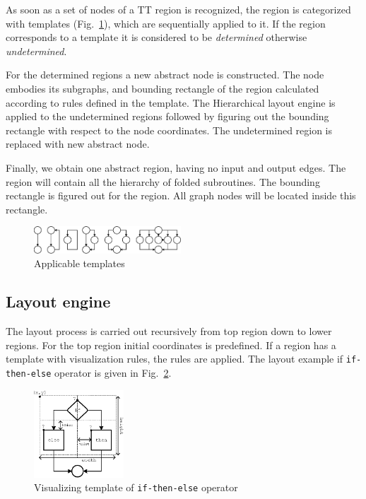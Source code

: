 \documentclass[conference]{IEEEtran}
\begin{document}

As soon as a set of nodes of a TT region is recognized, the region is categorized with templates (Fig.~\ref{fig:Regions}), which are sequentially applied to it.  If the region corresponds to a template it is considered to be \emph{determined} otherwise \emph{undetermined}.

For the determined regions a new abstract node is constructed.  The node embodies its subgraphs, and bounding rectangle of the region calculated according to rules defined in the template.  The Hierarchical layout engine is applied to the undetermined regions followed by figuring out the bounding rectangle with respect to the node coordinates.  The undetermined region is replaced with new abstract node.

Finally, we obtain one abstract region, having no input and output edges.  The region will contain all the hierarchy of folded subroutines.  The bounding rectangle is figured out for the region.  All graph nodes will be located inside this rectangle.

\begin{figure}[b]
	\centering
		\includegraphics[width=0.49\textwidth]{Pic/Reg.eps}
	\caption{Applicable templates}
	\label{fig:Regions}
\end{figure}

\subsection{Layout engine}
\label{sec:raskladka-process}

The layout process is carried out recursively from top region down to lower regions.  For the top region initial coordinates is predefined.  If a region has a template with visualization rules, the rules are applied.  The layout example if \texttt{if-then-else} operator is given in Fig.~\ref{fig:IfThenElse}.

\begin{figure}[b]
	\centering
		\includegraphics[width=0.3\textwidth]{Pic/IfThenElse.eps}
	\caption{Visualizing template of \texttt{if-then-else} operator}
	\label{fig:IfThenElse}
\end{figure}
\end{document}

